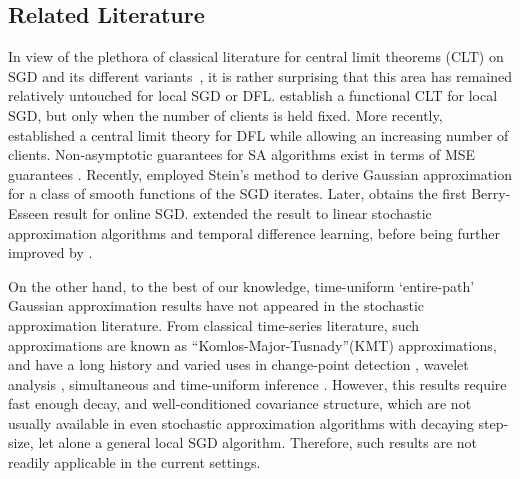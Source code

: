 \documentclass[a4paper,11pt]{article}
\numberwithin{equation}{section}
\theoremstyle{plain}
\theoremstyle{remark}
\begin{document}
\subsection{Related Literature}\label{se:related-lit}
In view of the plethora of classical literature for central limit theorems (CLT) on SGD and its different variants~\cite{ruppert1988efficient,polyak1992acceleration, chen2020statistical}, it is rather surprising that this area has remained relatively untouched for local SGD or DFL. \cite{li2022statistical} establish a functional CLT for local SGD, but only when the number of clients is held fixed. More recently, \cite{songxichen2024} established a central limit theory for DFL while allowing an increasing number of clients. 
Non-asymptotic guarantees for SA algorithms exist in terms of MSE guarantees \cite{nemirovski2009robust, moulines2011non, lan2012optimal, mou2024}. Recently, \cite{anastasiou2019normal} employed Stein's method to derive Gaussian approximation for a class of smooth functions of the SGD iterates. Later, \cite{shao-berry-esseen} obtains the first Berry-Esseen result for online SGD. \cite{samsonov2024gaussian} extended the result to linear stochastic approximation algorithms and temporal difference learning, before being further improved by \cite{wu2024statistical,sheshukova2025gaussian}.

On the other hand, to the best of our knowledge, time-uniform `entire-path' Gaussian approximation results have not appeared in the stochastic approximation literature. From classical time-series literature, such approximations are known as ``Komlos-Major-Tusnady''(KMT) approximations, and have a long history \cite{komios1975approximation, sakhanenko1984, sakhanenko1989, Sakhanenko2006, goetzezaitsev, kmt, KarmakarWu2020} and varied uses in change-point detection \cite{zhibia}, wavelet analysis \cite{bonnerjee2024aos}, simultaneous and time-uniform inference \cite{liu-wu-2010-aos, xie2020asynchronous, karmakar2022simultaneous, waudbysmith-24-aos}. However, this results require fast enough decay, and well-conditioned covariance structure, which are not usually available in even stochastic approximation algorithms with decaying step-size, let alone a general local SGD algorithm. Therefore, such results are not readily applicable in the current settings.

\end{document}
